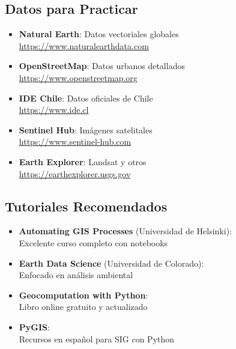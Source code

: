 \documentclass[11pt,a4paper]{article}
\begin{document}
\subsection{Datos para Practicar}

\begin{itemize}
    \item \textbf{Natural Earth}: Datos vectoriales globales\\
    \url{https://www.naturalearthdata.com}
    
    \item \textbf{OpenStreetMap}: Datos urbanos detallados\\
    \url{https://www.openstreetmap.org}
    
    \item \textbf{IDE Chile}: Datos oficiales de Chile\\
    \url{https://www.ide.cl}
    
    \item \textbf{Sentinel Hub}: Imágenes satelitales\\
    \url{https://www.sentinel-hub.com}
    
    \item \textbf{Earth Explorer}: Landsat y otros\\
    \url{https://earthexplorer.usgs.gov}
\end{itemize}

\subsection{Tutoriales Recomendados}

\begin{itemize}
    \item \textbf{Automating GIS Processes} (Universidad de Helsinki):\\
    Excelente curso completo con notebooks
    
    \item \textbf{Earth Data Science} (Universidad de Colorado):\\
    Enfocado en análisis ambiental
    
    \item \textbf{Geocomputation with Python}:\\
    Libro online gratuito y actualizado
    
    \item \textbf{PyGIS}:\\
    Recursos en español para SIG con Python
\end{itemize}
\end{document}
